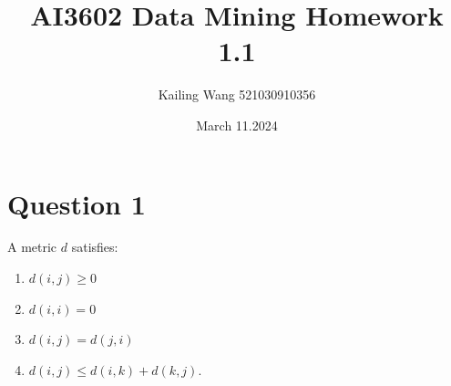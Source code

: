 \documentclass{article}
\begin{document}
	\title{AI3602 Data Mining Homework 1.1}
	\author{Kailing Wang 521030910356}
	\date{March 11.2024}
	\maketitle

	\section*{Question 1}
	A metric $d$ satisfies:
	\begin{enumerate}[1)]
		\item $d(i, j)\geq 0$
		\item $d(i, i) = 0$
		\item $d(i, j) = d(j, i)$
		\item $d(i, j) \leq d(i, k) + d(k, j)$.
	\end{enumerate}
	
\end{document}
